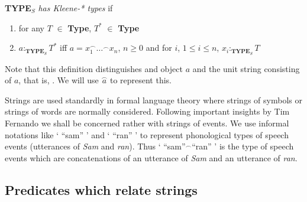 \textbf{TYPE}$_S$ \textit{has Kleene-* types} if
\begin{enumerate} 
 
\item 
for any $T$ $\in$ {\bf Type},  $T^*$ $\in$ {\bf Type} 
 
\item $a:_{\mathbf{TYPE}_S}T^*$ iff
  $a=x_1^\frown\!\ldots^\frown\!x_n$, $n\geq 0$ and for $i$, $1\leq
i\leq n$, $x_i:_{\mathbf{TYPE}_S}T$ 
 
\end{enumerate} 

Note that this definition distinguishes and object $a$ and the unit
string consisting of $a$, that is, .
We will use $\overset{\frown}{a}$ to represent this.

   
Strings are used standardly in formal language theory where strings of
symbols or strings of words are normally considered.  Following
important insights by Tim Fernando
\cite{Fernando2004,Fernando2006,Fernando2008,Fernando2009} we shall be
concerned rather with strings of events.   We use informal notations
like ` ``sam'' ' and ` ``ran'' '  to represent phonological types of
speech events (utterances of \textit{Sam} and \textit{ran}).  Thus `
``sam''$^{\frown}$``ran'' ' is the type of speech events which are
concatenations of an utterance of \textit{Sam} and an utterance of \textit{ran}.

\subsection*{Predicates which relate strings}

